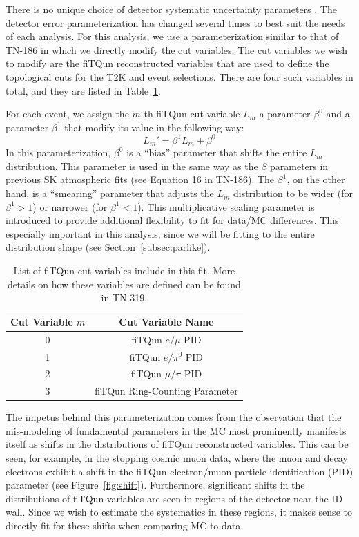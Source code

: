 There is no unique choice of detector systematic uncertainty parameters \ldsk.
The detector error parameterization has changed several times to best suit the
needs of each analysis. For this analysis, we use a parameterization
similar to that of TN-186 in which we directly modify the cut variables.  The
cut variables we wish to modify are the fiTQun reconstructed variables that are
used to define the topological cuts for the T2K \nue and \numu event
selections.  There are four such variables in total, and they are listed
in Table~\ref{tab:fqvars}.

For each event, we assign the $m$-th fiTQun cut variable $L_{m}$ a parameter
$\beta^{0}$ and a parameter $\beta^{1}$ that modify its value in the following
way:
%
\begin{equation}
  \label{eq:fqparmod}
  L_{m}' = \beta^{1} L_{m} + \beta^{0}
\end{equation}
%
In this parameterization, $\beta^{0}$ is a ``bias'' parameter that shifts the
entire $L_{m}$ distribution.  This parameter is used in the same way as the
$\beta$ parameters in previous SK atmospheric fits (see Equation 16 in TN-186).
The $\beta^{1}$, on the other hand, is a ``smearing'' parameter that adjusts
the $L_{m}$ distribution to be wider (for $\beta^{1} > 1$) or narrower (for
$\beta^{1} < 1$).  This multiplicative scaling parameter is introduced to
provide additional flexibility to fit for data/MC differences.  This especially
important in this analysis, since we will be fitting to the entire
distribution shape (see Section~\ref{subsec:parlike}).

\begin{table}
  \centering
  \begin{tabular}{c | c}
    \hline\hline
    Cut Variable $m$ & Cut Variable  Name \\
    \hline
    0 & fiTQun $e/\mu$ PID \\
    1 & fiTQun $e/\pi^{0}$ PID \\
    2 & fiTQun $\mu/\pi$ PID \\
    3 & fiTQun Ring-Counting Parameter \\
    \hline\hline
  \end{tabular}
  \caption{List of fiTQun cut variables include in this fit.  More details on
  how these variables are defined can be found in TN-319.}
  \label{tab:fqvars}
\end{table}

The impetus behind this parameterization comes from the observation that the
mis-modeling of fundamental parameters in the MC most prominently manifests
itself as shifts in the distributions of fiTQun reconstructed variables. This
can be seen, for example, in the stopping cosmic muon data, where the muon and
decay electrons exhibit a shift in the fiTQun electron/muon particle
identification (PID) parameter (see Figure~\ref{fig:shift}).  Furthermore,
significant shifts in the distributions of fiTQun variables are seen in regions
of the detector near the ID wall.  Since we wish to estimate the systematics in
these regions, it makes sense to directly fit for these shifts when comparing
MC to data. 

